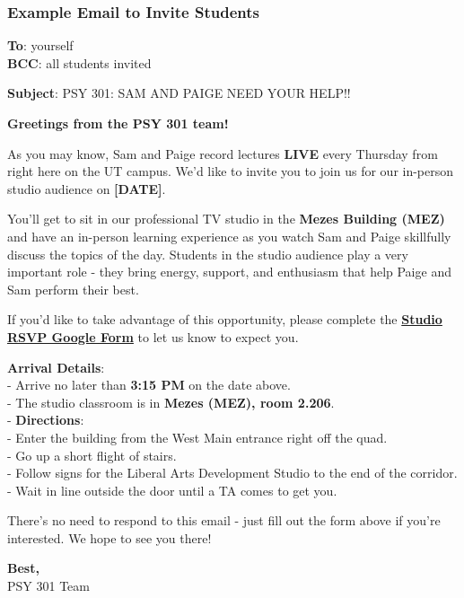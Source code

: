 \documentclass[
]{article}
\begin{document}
\hypertarget{example-email-to-invite-students}{%
\subsubsection{Example Email to Invite Students}\label{example-email-to-invite-students}}

\textbf{To}: yourself\\
\textbf{BCC}: all students invited

\textbf{Subject}: PSY 301: SAM AND PAIGE NEED YOUR HELP!!

\textbf{Greetings from the PSY 301 team!}

As you may know, Sam and Paige record lectures \textbf{LIVE} every Thursday from right here on the UT campus. We'd like to invite you to join us for our in-person studio audience on \textbf{{[}DATE{]}}.

You'll get to sit in our professional TV studio in the \textbf{Mezes Building (MEZ)} and have an in-person learning experience as you watch Sam and Paige skillfully discuss the topics of the day. Students in the studio audience play a very important role - they bring energy, support, and enthusiasm that help Paige and Sam perform their best.

If you'd like to take advantage of this opportunity, please complete the \textbf{\href{https://docs.google.com/forms/d/e/1FAIpQLSf78IM5OYt4hCd3_si7c0RAzMm8IVTHrM-3eibe-eiXvmFmGQ/viewform}{Studio RSVP Google Form}} to let us know to expect you.

\textbf{Arrival Details}:\\
- Arrive no later than \textbf{3:15 PM} on the date above.\\
- The studio classroom is in \textbf{Mezes (MEZ), room 2.206}.\\
- \textbf{Directions}:\\
- Enter the building from the West Main entrance right off the quad.\\
- Go up a short flight of stairs.\\
- Follow signs for the Liberal Arts Development Studio to the end of the corridor.\\
- Wait in line outside the door until a TA comes to get you.

There's no need to respond to this email - just fill out the form above if you're interested. We hope to see you there!

\textbf{Best,}\\
PSY 301 Team
\end{document}

